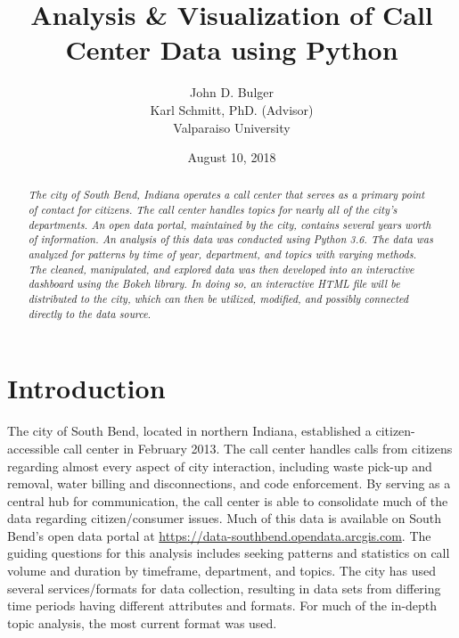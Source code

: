 \documentclass[11pt,twocolumn]{article}
\title{Analysis \& Visualization of Call Center Data using Python}
\author{John D. Bulger
\\
Karl Schmitt, PhD. (Advisor)
\\
Valparaiso University\\
}
\date{August 10, 2018}
\begin{document}
\maketitle

\begin{abstract}
\textit{The city of South Bend, Indiana operates a call center that serves as a primary point of contact for citizens.  The call center handles topics for nearly all of the city's departments.  An open data portal, maintained by the city, contains several years worth of information.  An analysis of this data was conducted using Python 3.6.  The data was 
analyzed for patterns by time of year, department, and topics with varying methods.  The cleaned, manipulated, and explored data was then developed into an 
interactive dashboard using the Bokeh library.  In doing so, an interactive HTML file will be distributed to the city, which can then be utilized, modified, and possibly connected 
directly to the data source}.
\end{abstract}

\section{Introduction}
The city of South Bend, located in northern Indiana, established a citizen-accessible call center in February 2013.  The call center handles calls from citizens regarding almost every aspect of city interaction, including waste pick-up and removal, water billing and disconnections, 
and code enforcement.  By serving as a central hub for communication, the call center is able to consolidate much of the data regarding citizen/consumer issues.  
Much of this data is available on South Bend's open data portal at \href{https://data-southbend.opendata.arcgis.com}{https://data-southbend.opendata.arcgis.com}.  The guiding questions for this analysis includes seeking patterns and statistics on call volume and duration by timeframe, department, and topics.  The city has used several services/formats for data collection, resulting in data sets from differing time periods having different attributes and formats.  For much of the in-depth topic analysis, the most current format was used.
\end{document}
